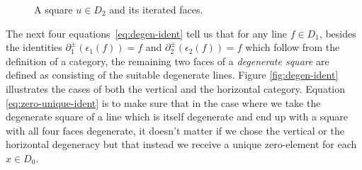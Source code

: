 \begin{figure} \centering
{}
\caption{A square $u \in D_2$ and its iterated faces.}
\label{fig:corner-ident}
\end{figure}

The next four equations~\ref{eq:degen-ident} tell us that for any line $f \in D_1$,
besides the identities
$\partial^\pm_1(\epsilon_1(f)) = f$ and
$\partial^\pm_2(\epsilon_2(f)) = f$ which follow from the definition of a
category, the remaining two faces of a \emph{degenerate square} are defined as
consisting of the suitable degenerate lines. Figure \ref{fig:degen-ident}
illustrates the cases of both the vertical and the horizontal category. Equation
\ref{eq:zero-unique-ident} is to make sure that in the case where we take the degenerate
square of a line which is itself degenerate and end up with a square with all four
faces degenerate, it doesn't matter if we chose the vertical or the horizontal
degeneracy but that instead we receive a unique zero-element for each $x \in D_0$.

